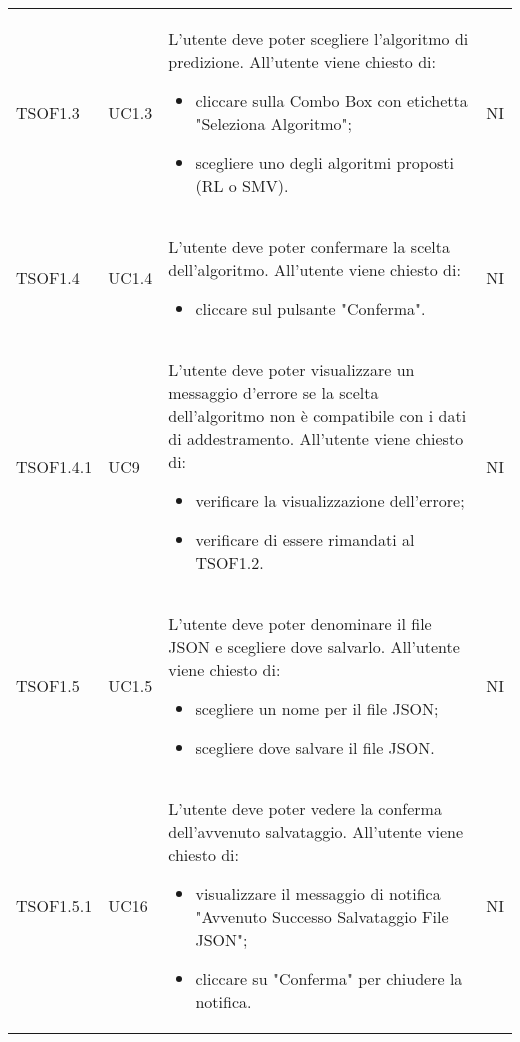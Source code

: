 \begin{longtable}{C{2.5cm} C{2.5cm} L{8cm} C{2cm}}
TSOF1.3 & UC1.3 & 
L'utente deve poter scegliere l'algoritmo di predizione. \newline All'utente viene chiesto di:
\begin{itemize}
	\item cliccare sulla Combo Box con etichetta "Seleziona Algoritmo";
	\item scegliere uno degli algoritmi proposti (RL o SMV).
\end{itemize} & NI \\
 
TSOF1.4 & UC1.4 & 
L'utente deve poter confermare la scelta dell'algoritmo. \newline All'utente viene chiesto di:
\begin{itemize}
	\item cliccare sul pulsante "Conferma".
\end{itemize} & NI \\

TSOF1.4.1 & UC9 & 
L'utente deve poter visualizzare un messaggio d'errore se la scelta dell'algoritmo non è compatibile con i dati di addestramento. \newline All'utente viene chiesto di:
\begin{itemize}
	\item verificare la visualizzazione dell'errore;
	\item verificare di essere rimandati al TSOF1.2.
\end{itemize} & NI \\

TSOF1.5 & UC1.5 & 
L'utente deve poter denominare il file JSON e scegliere dove salvarlo. \newline All'utente viene chiesto di:
\begin{itemize}
	\item scegliere un nome per il file JSON;
	\item scegliere dove salvare il file JSON.
\end{itemize} & NI \\

TSOF1.5.1 & UC16 &
L'utente deve poter vedere la conferma dell'avvenuto salvataggio. \newline All'utente viene chiesto di:
\begin{itemize}
	\item visualizzare il messaggio di notifica "Avvenuto Successo Salvataggio File JSON";
	\item cliccare su "Conferma" per chiudere la notifica.
\end{itemize} & NI	\\


\end{longtable}
